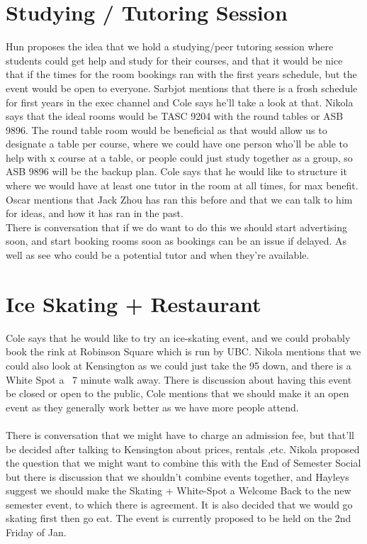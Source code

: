 \documentclass[12pt]{article}
\begin{document}
\section{Studying / Tutoring Session} \label{sec:Tutor}
\noindent Hun proposes the idea that we hold a studying/peer tutoring session where students could get help and study for their courses, and that it would be nice that if the times for the room bookings ran with the first years schedule, but the event would be open to everyone. Sarbjot mentions that there is a frosh schedule for first years in the exec channel and Cole says he'll take a look at that. Nikola says that the ideal rooms would be TASC 9204 with the round tables or ASB 9896. The round table room would be beneficial as that would allow us to designate a table per course, where we could have one person who'll be able to help with x course at a table, or people could just study together as a group, so ASB 9896 will be the backup plan.  Cole says that he would like to structure it where we would have at least one tutor in the room at all times, for max benefit. Oscar mentions that Jack Zhou has ran this before and that we can talk to him for ideas, and how it has ran in the past.  \\ 

\noindent There is conversation that if we do want to do this we should start advertising soon, and start booking rooms soon as bookings can be an issue if delayed. As well as see who could be a potential tutor and when they're available. 

\section{Ice Skating + Restaurant} \label{sec:Skate}
\noindent Cole says that he would like to try an ice-skating event, and we could probably book the rink at Robinson Square which is run by UBC. Nikola mentions that we could also look at Kensington as we could just take the 95 down, and there is a White Spot a ~7 minute walk away.  There is discussion about having this event be closed or open to the public, Cole mentions that we should make it an open event as they generally work better as we have more people attend. \\  \\
\noindent There is conversation that we might have to charge an admission fee, but that'll be decided after talking to Kensington about prices, rentals ,etc. Nikola proposed the question that we might want to combine this with the End of Semester Social but there is discussion that we shouldn't combine events together, and Hayleys suggest we should make the Skating + White-Spot a  Welcome Back to the new semester event, to which there is agreement. It is also decided that we would go skating first then go eat. The event is currently proposed to be held on the 2nd Friday of Jan.\\
\end{document}
